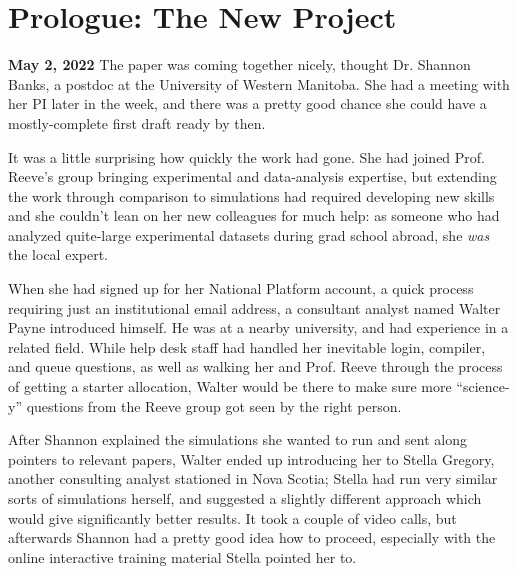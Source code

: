 \documentclass[11pt, letterpaper, twoside]{article}
\begin{document}
\section*{Prologue: The New Project}
%

\begin{tcolorbox}[enhanced,breakable,colback=gray!15,colframe=cdaRed,parbox=false]
\sffamily \textbf{May 2, 2022} The paper was coming together nicely,
thought Dr. Shannon Banks, a postdoc at the University of Western
Manitoba. She had a meeting with her PI later in the week, and there
was a pretty good chance she could have a mostly-complete first draft
ready by then.

It was a little surprising how quickly the work had gone. She had joined
Prof. Reeve's group bringing experimental and data-analysis expertise,
but extending the work through comparison to simulations had required
developing new skills and she couldn't lean on her new colleagues for
much help: as someone who had analyzed quite-large experimental datasets
during grad school abroad, she \textit{was} the local expert.

When she had signed up for her National Platform account, a quick
process requiring just an institutional email address, a consultant
analyst named Walter Payne introduced himself. He was at a nearby
university, and had experience in a related field. While help desk staff
had handled her inevitable login, compiler, and queue questions, as well
as walking her and Prof. Reeve through the process of getting a starter
allocation, Walter would be there to make sure more ``science-y''
questions from the Reeve group got seen by the right person.

After Shannon explained the simulations she wanted to run and sent along
pointers to relevant papers, Walter ended up introducing her to Stella
Gregory, another consulting analyst stationed in Nova Scotia; Stella had
run very similar sorts of simulations herself, and suggested a slightly
different approach which would give significantly better results. It
took a couple of video calls, but afterwards Shannon had a pretty good
idea how to proceed, especially with the online interactive training
material Stella pointed her to.


\end{tcolorbox}
\end{document}
